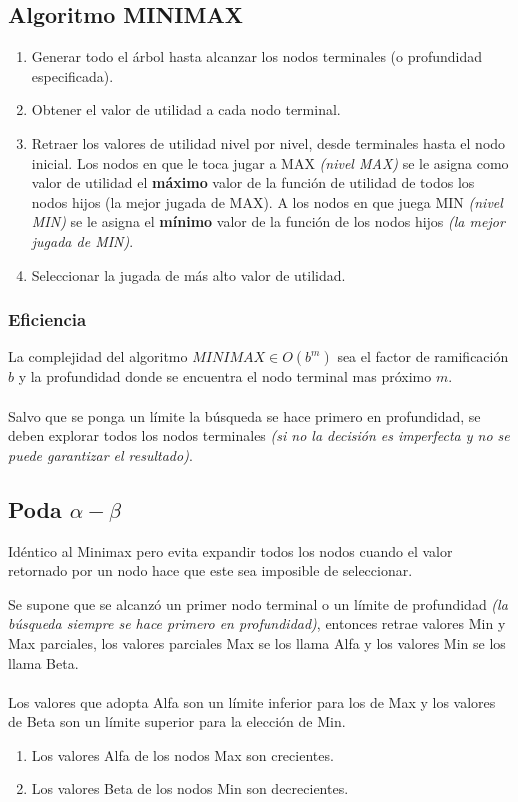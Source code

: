 \subsection{Algoritmo MINIMAX}
\begin{enumerate}
	\item Generar todo el árbol hasta alcanzar los nodos terminales (o profundidad especificada).
	\item Obtener el valor de utilidad a cada nodo terminal.
	\item Retraer los valores de utilidad nivel por nivel, desde terminales hasta el nodo inicial. Los nodos en que le toca jugar a MAX \textit{(nivel MAX)} se le asigna como valor de utilidad el \textbf{máximo} valor de la función de utilidad de todos los nodos hijos (la mejor jugada de MAX). A los nodos en que juega MIN \textit{(nivel MIN)} se le asigna el \textbf{mínimo} valor de la función de los nodos hijos \textit{(la mejor jugada de MIN)}.
	\item Seleccionar la jugada de más alto valor de utilidad.
\end{enumerate}

\subsubsection{Eficiencia}
La complejidad del algoritmo $MINIMAX\in O(b^m)$ sea el factor de ramificación $b$ y la profundidad donde se encuentra el nodo terminal mas próximo $m$.
\\\\
Salvo que se ponga un límite la búsqueda se hace primero en profundidad, se deben explorar todos los nodos terminales \textit{(si no la decisión es imperfecta y no se puede garantizar el resultado)}.

\subsection{Poda $\alpha-\beta$}
Idéntico al Minimax pero evita expandir todos los nodos cuando el valor
retornado por un nodo hace que este sea imposible de seleccionar.

Se supone que se alcanzó un primer nodo terminal o un límite de profundidad\textit{ (la búsqueda siempre se hace primero en profundidad)}, entonces retrae valores Min y Max parciales, los valores parciales Max se los llama Alfa y los valores Min se los llama Beta.
\\\\
Los valores que adopta Alfa son un límite inferior para los de Max y los valores de Beta son un límite superior para la elección de Min.
\begin{enumerate}
	\item Los valores Alfa de los nodos Max son crecientes.
	\item Los valores Beta de los nodos Min son decrecientes.
\end{enumerate}

